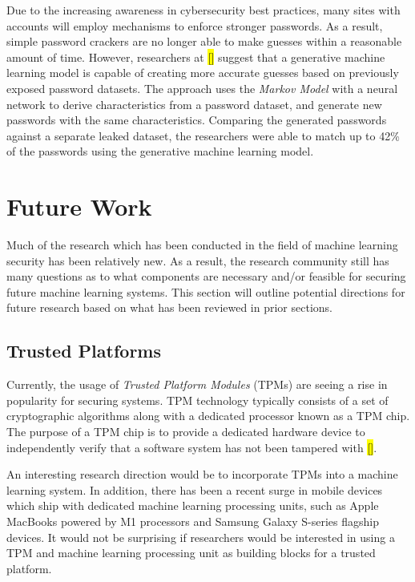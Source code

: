 \documentclass[11pt,conference]{IEEEtran}
\begin{document}
Due to the increasing awareness in cybersecurity best practices, many sites
with accounts will employ mechanisms to enforce stronger passwords. As a
result, simple password crackers are no longer able to make guesses 
within a reasonable amount of time. However, researchers at \hl{[]} suggest that a
generative machine learning model is capable of creating more accurate guesses
based on previously exposed password datasets. The approach uses the
\emph{Markov Model} with a neural network to derive characteristics from a
password dataset, and generate new passwords with the same characteristics.
Comparing the generated passwords against a separate leaked dataset, the
researchers were able to match up to 42\% of the passwords using the generative
machine learning model.

\section{Future Work}
Much of the research which has been conducted in the field of machine learning
security has been relatively new. As a result, the research community still has
many questions as to what components are necessary and/or feasible for securing
future machine learning systems.
This section will outline potential directions for future research based on
what has been reviewed in prior sections.

\subsection{Trusted Platforms}
Currently, the usage of \emph{Trusted Platform Modules} (TPMs) are seeing a
rise in popularity for securing systems. TPM technology typically consists of a
set of cryptographic algorithms along with a dedicated processor known as a TPM
chip. The purpose of a TPM chip is to provide a dedicated hardware device to
independently verify that a software system has not been tampered with \hl{[]}. 

An interesting research direction would be to incorporate TPMs into a machine
learning system. In addition, there has been a recent surge in mobile devices
which ship with dedicated machine learning processing units, such as Apple
MacBooks powered by M1 processors and Samsung Galaxy S-series flagship devices.
It would not be surprising if researchers would be interested in using a TPM
and machine learning processing unit as building blocks for a trusted platform.
\end{document}
